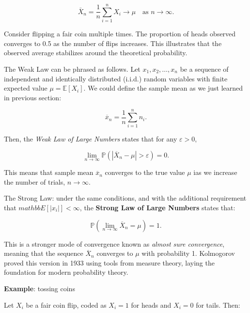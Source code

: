 \documentclass{book}
\begin{document}
\begin{equation}
    \bar{X}_n = \frac{1}{n} \sum_{i=1}^{n} X_i \to \mu \quad \text{as } n \to \infty.
\end{equation}

Consider flipping a fair coin multiple times. The proportion of heads observed converges to 0.5 as the number of flips increases. This illustrates that the observed average stabilizes around the theoretical probability.

\medskip

The Weak Law can be phrased as follows. Let $x_1, x_2, \dots, x_n$ be a sequence of independent and identically distributed (i.i.d.) random variables with finite expected value $\mu = \mathbb{E}[X_i]$. We could define the sample mean as we just learned in previous section:

\begin{equation}
	\overline{x}_n = \frac{1}{n} \sum_{i=1}^n n_i.
\end{equation}

Then, the \textit{Weak Law of Large Numbers} states that for any $\varepsilon > 0$,

\begin{equation}
	\lim_{n \to \infty} \mathbb{P}\left( \left| \overline{X}_n - \mu \right| > \varepsilon \right) = 0.
\end{equation}

This means that sample mean $\overline{x}_n$ converges to the true value $\mu$ ias we increase the number of trials, $n \to \infty$.

\medskip

The Strong Law: under the same conditions, and with the additional requirement that $mathbb{E}[|x_i|] < \infty$, the \textbf{Strong Law of Large Numbers} states that:

\begin{equation}
	\mathbb{P}\left( \lim_{n \to \infty} \overline{X}_n = \mu \right) = 1.
\end{equation}

This is a stronger mode of convergence known as \emph{almost sure convergence}, meaning that the sequence \( \overline{X}_n \) converges to \( \mu \) with probability 1. Kolmogorov proved this version in 1933 using tools from measure theory, laying the foundation for modern probability theory.

\medskip

\textbf{Example}: tossing coins

Let \( X_i \) be a fair coin flip, coded as \( X_i = 1 \) for heads and \( X_i = 0 \) for tails. Then:
\end{document}
